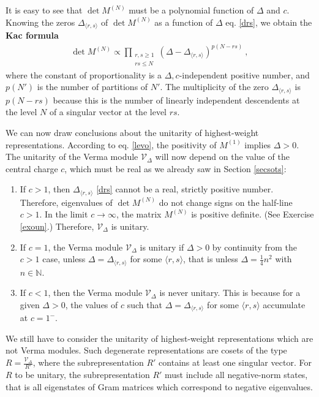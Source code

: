 \documentclass[12pt, a4paper, notitlepage, twoside]{report}
\numberwithin{equation}{section}
\theoremstyle{break}
\begin{document}
It is easy to see that $\det M^{(N)}$ must be a polynomial function of $\Delta$ and $c$.
Knowing the zeros $\Delta_{\langle r,s \rangle}$ of $\det M^{(N)}$ as a function of $\Delta$ eq. \eqref{drs}, we obtain the \textbf{\boldmath Kac formula} 
\begin{align}
 \boxed{\det M^{(N)} \propto \prod_{\begin{smallmatrix} r,s\geq 1 \\ rs \leq N \end{smallmatrix}} (\Delta-\Delta_{\langle r,s \rangle})^{p(N-rs)}} \ ,
\end{align}
where the constant of proportionality is a $\Delta,c$-independent positive number, and $p(N')$ is the number of partitions of $N'$.
The multiplicity of the zero $\Delta_{\langle r,s \rangle}$ is $p(N-rs)$ because this is the number of linearly independent descendents at the level $N$ of a singular vector at the level $rs$.  

We can now draw conclusions about the unitarity of highest-weight representations.
According to eq. \eqref{levo}, the positivity of $M^{(1)}$ implies $\Delta >0$. 
The unitarity of the Verma module $\mathcal{V}_\Delta$ will now depend on the value of the central charge $c$, which must be real 
as we already saw in Section \ref{secsots}:
\begin{enumerate}
 \item 
If $c > 1$, then $\Delta_{\langle r,s \rangle}$ \eqref{drs} cannot be a real, strictly positive number. 
Therefore, eigenvalues of $\det M^{(N)}$ do not change signs on the half-line $c > 1$.
In the limit $c \to \infty$, the matrix $M^{(N)}$ is positive definite. (See Exercise \ref{exoun}.) 
Therefore, $\mathcal{V}_\Delta$ is unitary. 
\item 
If $c=1$, the Verma module $\mathcal{V}_\Delta$ is unitary if $\Delta > 0$ by continuity from the $c>1$ case, unless $\Delta=\Delta_{\langle r,s \rangle}$ for some $\langle r,s \rangle$, that is unless $\Delta =\frac14 n^2$ with $n\in {\mathbb{N}}$.
\item 
If $c<1$, then the Verma module $\mathcal{V}_\Delta$ is never unitary. 
This is because for a given $\Delta>0$, the values of $c$ such that $\Delta = \Delta_{\langle r,s \rangle}$ for some $\langle r,s \rangle$ accumulate at $c=1^-$.
\end{enumerate}

We still have to consider the unitarity of highest-weight representations which are not Verma modules.
Such degenerate representations are cosets of the type $R=\frac{\mathcal{V}_\Delta}{R'}$, where the subrepresentation $R'$ contains at least one singular vector. 
For $R$ to be unitary, the subrepresentation $R'$ must include all negative-norm states, that is all eigenstates of Gram matrices which correspond to negative eigenvalues.
\end{document}
